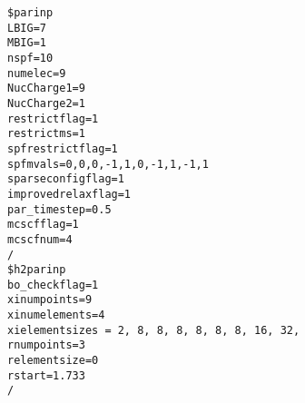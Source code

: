 {\footnotesize \begin{verbatim}
$parinp
LBIG=7
MBIG=1
nspf=10
numelec=9
NucCharge1=9
NucCharge2=1
restrictflag=1
restrictms=1
spfrestrictflag=1
spfmvals=0,0,0,-1,1,0,-1,1,-1,1
sparseconfigflag=1
improvedrelaxflag=1
par_timestep=0.5  
mcscfflag=1
mcscfnum=4
/
$h2parinp
bo_checkflag=1
xinumpoints=9
xinumelements=4
xielementsizes = 2, 8, 8, 8, 8, 8, 8, 16, 32, 
rnumpoints=3
relementsize=0
rstart=1.733
/
\end{verbatim}}
